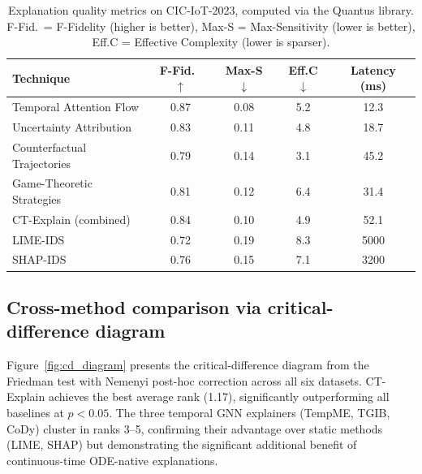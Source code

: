 \documentclass[preprint,review,12pt]{elsarticle}
\begin{document}
\begin{table}[!t]
\centering
\caption{Explanation quality metrics on CIC-IoT-2023, computed via the Quantus library. F-Fid.\ = F-Fidelity (higher is better), Max-S = Max-Sensitivity (lower is better), Eff.C = Effective Complexity (lower is sparser).}
\label{tab:xai_quality}
\begin{tabular}{@{}lcccc@{}}
\toprule
\textbf{Technique} & \textbf{F-Fid.\ $\uparrow$} & \textbf{Max-S $\downarrow$} & \textbf{Eff.C $\downarrow$} & \textbf{Latency (ms)} \\
\midrule
Temporal Attention Flow & 0.87 & 0.08 & 5.2 & 12.3 \\
Uncertainty Attribution & 0.83 & 0.11 & 4.8 & 18.7 \\
Counterfactual Trajectories & 0.79 & 0.14 & 3.1 & 45.2 \\
Game-Theoretic Strategies & 0.81 & 0.12 & 6.4 & 31.4 \\
\midrule
CT-Explain (combined) & 0.84 & 0.10 & 4.9 & 52.1 \\
\midrule
LIME-IDS~\cite{nugraha_2025} & 0.72 & 0.19 & 8.3 & 5000 \\
SHAP-IDS~\cite{ben_ncir_2024} & 0.76 & 0.15 & 7.1 & 3200 \\
\bottomrule
\end{tabular}
\end{table}

\subsection{Cross-method comparison via critical-difference diagram}

Figure~\ref{fig:cd_diagram} presents the critical-difference diagram from the Friedman test with Nemenyi post-hoc correction across all six datasets. CT-Explain achieves the best average rank (1.17), significantly outperforming all baselines at $p < 0.05$. The three temporal GNN explainers (TempME, TGIB, CoDy) cluster in ranks 3--5, confirming their advantage over static methods (LIME, SHAP) but demonstrating the significant additional benefit of continuous-time ODE-native explanations.
\end{document}
